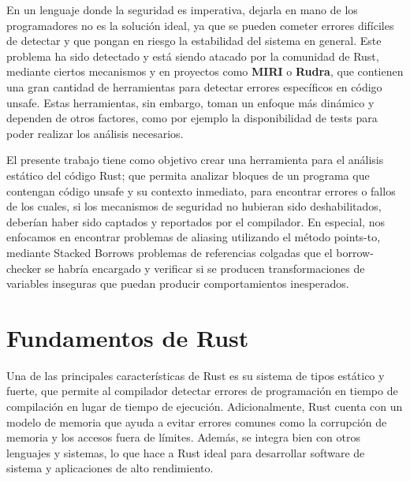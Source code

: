 En un lenguaje donde la seguridad es imperativa, dejarla en mano de los programadores no es la solución ideal, ya que se pueden cometer errores difíciles de detectar y que pongan en riesgo la estabilidad del sistema en general. Este problema ha sido detectado y está siendo atacado por la comunidad de Rust, mediante ciertos mecanismos y en proyectos como \textbf{MIRI} o \textbf{Rudra}, que contienen una gran cantidad de herramientas para detectar errores específicos en código unsafe. Estas herramientas, sin embargo, toman un enfoque más dinámico y dependen de otros factores, como por ejemplo la disponibilidad de tests para poder realizar los análisis necesarios.

El presente trabajo tiene como objetivo crear una herramienta para el análisis estático del código Rust; que permita analizar bloques de un programa que contengan código unsafe y su contexto inmediato, para encontrar errores o fallos de los cuales, si los mecanismos de seguridad no hubieran sido deshabilitados, deberían haber sido captados y reportados por el compilador. En especial, nos enfocamos en encontrar problemas de aliasing utilizando el método points-to, mediante Stacked Borrows problemas de referencias colgadas que el borrow-checker se habría encargado y verificar si se producen transformaciones de variables inseguras que puedan producir comportamientos inesperados.


\section{Fundamentos de Rust}

Una de las principales características de Rust es su sistema de tipos estático y fuerte, que permite al compilador detectar errores de programación en tiempo de compilación en lugar de tiempo de ejecución. Adicionalmente, Rust cuenta con un modelo de memoria que ayuda a evitar errores comunes como la corrupción de memoria y los accesos fuera de límites. Además, se integra bien con otros lenguajes y sistemas, lo que hace a Rust ideal para desarrollar software de sistema y aplicaciones de alto rendimiento.

